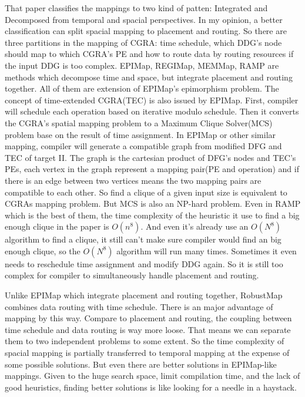 That paper classifies the mappings to two kind of patten: Integrated and  Decomposed from temporal and spacial perspectives. In my opinion, a better classification can split spacial mapping to placement and routing. So there are three partitions in the mapping of CGRA: time schedule, which DDG's node should map to which CGRA's PE and how to route data by routing resources if the input DDG is too complex. EPIMap\cite[]{EPIMap}, REGIMap\cite[]{REGIMap}, MEMMap\cite[]{MEMMap}, RAMP\cite[]{RAMP} are methods which decompose time and space, but integrate placement and routing together. All of them are extension of EPIMap’s epimorphism problem. The concept of time-extended CGRA(TEC) is also issued by EPIMap. First, compiler will schedule each operation based on iterative modulo schedule\cite[]{IMS}. Then it converts the CGRA's spatial mapping problem to a Maximum Clique Solver(MCS) problem base on the result of time assignment. In EPIMap or other similar mapping, compiler will generate a compatible graph from modified DFG and TEC of target II. The graph is the cartesian product of DFG's nodes and TEC's PEs, each vertex in the graph represent a mapping pair(PE and operation) and if there is an edge between two vertices means the two mapping pairs are compatible to each other. So find a clique of a given input size is equivalent to CGRAs mapping problem. But MCS is also an NP-hard problem. Even in RAMP which is the best of them, the time complexity of the heuristic it use to find a big enough clique in the paper is $O(n^8)$. And even it's already use an $O(N^8)$ algorithm to find a clique, it still can't make sure compiler would find an big enough clique, so the $O(N^8)$ algorithm will run many times. Sometimes it even needs to reschedule time assignment and modify DDG again. So it is still too complex for compiler to simultaneously handle placement and routing.

Unlike EPIMap which integrate placement and routing together, RobustMap\cite[]{JD} combines data routing with time schedule. There is an major advantage of mapping by this way. Compare to placement and routing, the coupling between time schedule and data routing is way more loose. That means we can separate them to two independent problems to some  extent. So the time complexity of spacial mapping is partially transferred to temporal mapping at the expense of some possible solutions. But even there are better solutions in EPIMap-like mappings. Given to the huge search space, limit compilation time, and the lack of good heuristics, finding better solutions is like looking for a needle in a haystack. 
\section{}
